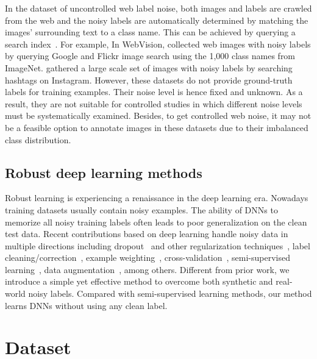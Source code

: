 \documentclass{article}
\begin{document}
In the dataset of uncontrolled web label noise, both images and labels are crawled from the web and the noisy labels are automatically determined by matching the images' surrounding text to a class name. This can be achieved by querying a search index~\citep{krause2016unreasonable,li2017webvision,mahajan2018exploring}. For example, In WebVision, \citet{li2017webvision} collected web images with noisy labels by querying Google and Flickr image search using the 1,000 class names from ImageNet. \citet{mahajan2018exploring} gathered a large scale set of images with noisy labels by searching hashtags on Instagram. However, these datasets do not provide ground-truth labels for training examples. Their noise level is hence fixed and unknown. As a result, they are not suitable for controlled studies in which different noise levels must be systematically examined. Besides, to get controlled web noise, it may not be a feasible option to annotate images in these datasets due to their imbalanced class distribution.

\subsection{Robust deep learning methods}
Robust learning is experiencing a renaissance in the deep learning era. Nowadays training datasets usually contain noisy examples. The ability of DNNs to memorize all noisy training labels often leads to poor generalization on the clean test data. Recent contributions based on deep learning handle noisy data in multiple directions including dropout~\citep{arpit2017closer} and other regularization techniques~\citep{azadi2016auxiliary,noh2017regularizing}, label cleaning/correction~\citep{reed2014training,goldberger2017training,Li2017ICCV,veit2017learning,song2019selfie}, example weighting~\citep{jiang2018mentornet,ren2018learning,shu2019meta,jiang2015self,liang2016learning}, 
cross-validation~\citep{northcutt2019confident}, semi-supervised learning~\citep{hendrycks2018using,vahdat2017toward,li2020dividemix,zhang2020distilling}, data augmentation~\citep{zhang2018mixup,cheng2019robust,cheng2020advaug,liang2020simaug}, among others. Different from prior work, we introduce a simple yet effective method to overcome both synthetic and real-world noisy labels. Compared with semi-supervised learning methods, our method learns DNNs without using any clean label.

\section{Dataset}\label{sec:dataset}
\end{document}
